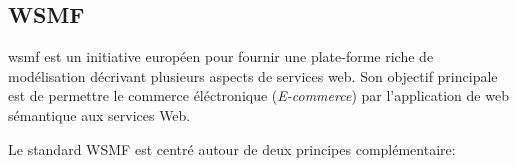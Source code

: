 


    \subsection{WSMF}
    \label{sec:wsmf}    
    \acrshort{wsmf} \cite{fensel2002web}est un initiative européen
    pour fournir une plate-forme riche de modélisation décrivant
    plusieurs aspects de services web. Son objectif principale est de
    permettre le commerce éléctronique (\emph{E-commerce}) par
    l'application de web sémantique aux services Web.

    Le standard \textsc{WSMF} est centré autour de deux principes
    complémentaire:
    

